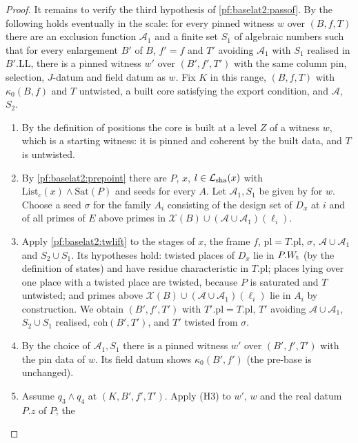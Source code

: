 \begin{proof}
It remains to verify the third hypothesis of \cref{pf:baselat2:passof}. By
 the following holds eventually in the scale: for every
pinned witness $w$ over $(B,f,T)$ there are an exclusion function $\mathcal A_1$ and a finite set $S_1$ of
algebraic numbers such that for every enlargement $B'$ of $B$, $f'=f$ and $T'$ avoiding $\mathcal A_1$ with
$S_1$ realised in $B'.\mathrm{LL}$, there is a pinned witness $w'$ over $(B',f',T')$ with the same column pin,
selection, $J$-datum and field datum as $w$. Fix $K$ in this range, $(B,f,T)$ with $\kappa_0(B,f)$ and $T$
untwisted, a built core satisfying the export condition, and $\mathcal A$, $S_2$.
\begin{enumerate}[label=(\arabic*)]
\item By the definition of positions the core
  is built at a level $Z$ of a witness $w$, which is a starting witness: it is pinned and coherent by
  the built data, and $T$ is untwisted.
\item By \cref{pf:baselat2:prepoint} there are $P$, $x$, $l\in\mathcal{L}_{\mathrm{sha}}(x)$ with
  $\mathrm{List}_c(x)\wedge\mathrm{Sat}(P)$ and seeds for every $A$. Let $\mathcal A_1,S_1$ be given by
   for $w$. Choose a seed $\sigma$ for the family
  $A_i$ consisting of the design set of $D_x$ at $i$ and of all primes of $E$ above primes in
  $\mathcal X(B)\cup(\mathcal A\cup\mathcal A_1)(\ell_i)$.
\item Apply \cref{pf:baselat2:twlift} to the stages of $x$, the frame $f$, $\mathrm{pl}=T.\mathrm{pl}$, $\sigma$,
  $\mathcal A\cup\mathcal A_1$ and $S_2\cup S_1$. Its hypotheses hold: twisted places of $D_x$ lie in
  $P.W_{\mathrm{t}}$ (by the definition of states) and have residue characteristic in
  $T.\mathrm{pl}$; places lying over one place with a twisted place are twisted, because $P$ is saturated
  and $T$ untwisted; and
  primes above $\mathcal X(B)\cup(\mathcal A\cup\mathcal A_1)(\ell_i)$ lie in $A_i$ by construction. We obtain $(B',f',T')$ with $T'.\mathrm{pl}=T.\mathrm{pl}$,
  $T'$ avoiding $\mathcal A\cup\mathcal A_1$, $S_2\cup S_1$ realised, $\mathrm{coh}(B',T')$, and $T'$ twisted from $\sigma$.
\item By the choice of $\mathcal A_1,S_1$ there is a pinned witness $w'$ over $(B',f',T')$ with the pin data of
  $w$. Its field datum shows $\kappa_0(B',f')$ (the pre-base is unchanged).
\item Assume $q_3\wedge q_4$ at $(K,B',f',T')$. Apply (H3) to $w'$, $w$ and the real datum $P.z$ of $P$; the

\end{enumerate}
\end{proof}
